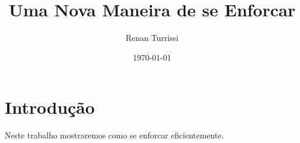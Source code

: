 \documentclass{article}
\author{Renan Turrissi}
\date{\today}
\title{Uma Nova Maneira de se Enforcar}
\begin{document}
\maketitle

\newpage

\section{Introdução}

Neste trabalho mostraremos como se enforcar eficientemente.
\end{document}
